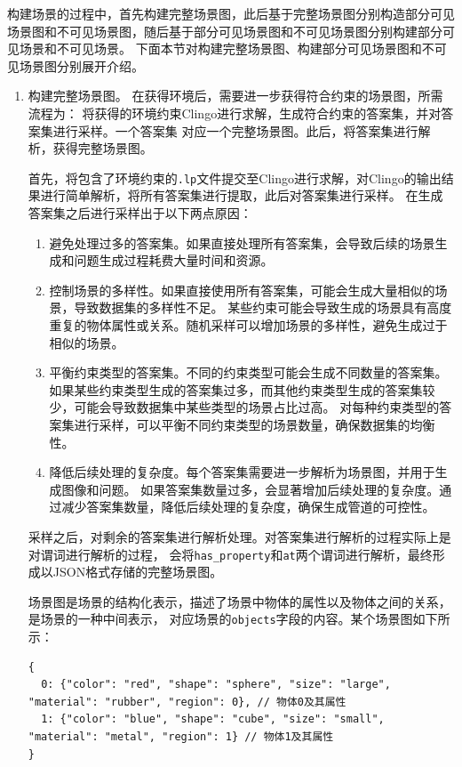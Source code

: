 构建场景的过程中，首先构建完整场景图，此后基于完整场景图分别构造部分可见场景图和不可见场景图，随后基于部分可见场景图和不可见场景图分别构建部分可见场景和不可见场景。
下面本节对构建完整场景图、构建部分可见场景图和不可见场景图分别展开介绍。
\begin{enumerate}[nosep]
\item 构建完整场景图。
在获得环境后，需要进一步获得符合约束的场景图，所需流程为：
将获得的环境约束Clingo进行求解，生成符合约束的答案集，并对答案集进行采样。一个答案集
对应一个完整场景图。此后，将答案集进行解析，获得完整场景图。

首先，将包含了环境约束的\texttt{.lp}文件提交至Clingo进行求解，对Clingo的输出结果进行简单解析，将所有答案集进行提取，此后对答案集进行采样。
在生成答案集之后进行采样出于以下两点原因：
\begin{enumerate}[nosep]
\item 避免处理过多的答案集。如果直接处理所有答案集，会导致后续的场景生成和问题生成过程耗费大量时间和资源。
\item 控制场景的多样性。如果直接使用所有答案集，可能会生成大量相似的场景，导致数据集的多样性不足。
某些约束可能会导致生成的场景具有高度重复的物体属性或关系。随机采样可以增加场景的多样性，避免生成过于相似的场景。
\item 平衡约束类型的答案集。不同的约束类型可能会生成不同数量的答案集。
如果某些约束类型生成的答案集过多，而其他约束类型生成的答案集较少，可能会导致数据集中某些类型的场景占比过高。
对每种约束类型的答案集进行采样，可以平衡不同约束类型的场景数量，确保数据集的均衡性。
\item 降低后续处理的复杂度。每个答案集需要进一步解析为场景图，并用于生成图像和问题。
如果答案集数量过多，会显著增加后续处理的复杂度。通过减少答案集数量，降低后续处理的复杂度，确保生成管道的可控性。
\end{enumerate}

采样之后，对剩余的答案集进行解析处理。对答案集进行解析的过程实际上是对谓词进行解析的过程，
会将\texttt{has\_property}和\texttt{at}两个谓词进行解析，最终形成以JSON格式存储的完整场景图。

场景图是场景的结构化表示，描述了场景中物体的属性以及物体之间的关系，是场景的一种中间表示，
对应场景的\texttt{objects}字段的内容。某个场景图如下所示：
\begin{lstlisting}
{
  0: {"color": "red", "shape": "sphere", "size": "large", "material": "rubber", "region": 0}, // 物体0及其属性
  1: {"color": "blue", "shape": "cube", "size": "small", "material": "metal", "region": 1} // 物体1及其属性
}
\end{lstlisting}


\end{enumerate}
